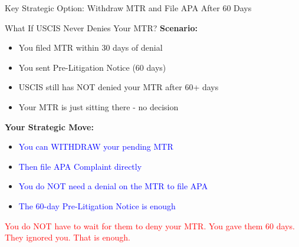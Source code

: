 \documentclass[11pt]{beamer}
\begin{document}
	
	
	\begin{frame}{Key Strategic Option: Withdraw MTR and File APA After 60 Days}
		\scriptsize
		\begin{block}{What If USCIS Never Denies Your MTR?}
			\textbf{Scenario:}
			\begin{itemize}
				\item You filed MTR within 30 days of denial
				\item You sent Pre-Litigation Notice (60 days)
				\item USCIS still has NOT denied your MTR after 60+ days
				\item Your MTR is just sitting there - no decision
			\end{itemize}
			\textbf{Your Strategic Move:}
			\begin{itemize}
				\item \textcolor{blue}{You can WITHDRAW your pending MTR}
				\item \textcolor{blue}{Then file APA Complaint directly}
				\item \textcolor{blue}{You do NOT need a denial on the MTR to file APA}
				\item \textcolor{blue}{The 60-day Pre-Litigation Notice is enough}
			\end{itemize}
			\textcolor{red}{You do NOT have to wait for them to deny your MTR.}
			\textcolor{red}{You gave them 60 days. They ignored you. That is enough.}
		\end{block}
	\end{frame}
	
\end{document}
